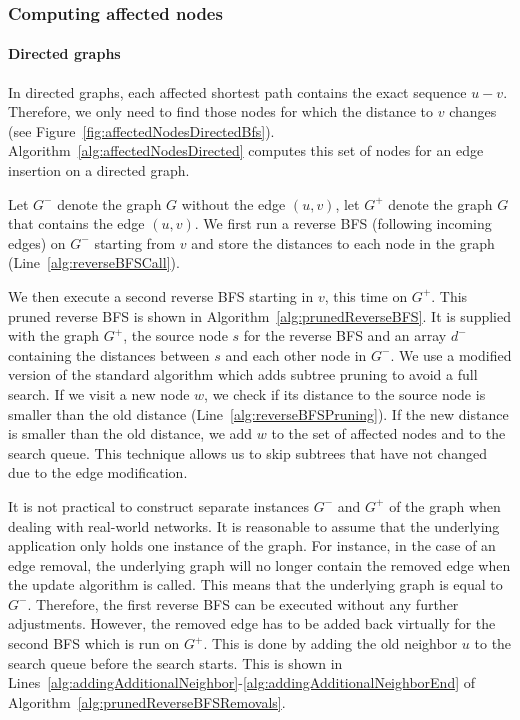 \subsubsection{Computing affected nodes}
\paragraph{Directed graphs}
In directed graphs, each affected shortest path contains the exact sequence $u - v$. Therefore, we only need to find those nodes for which the distance to $v$ changes (see Figure~\ref{fig:affectedNodesDirectedBfs}). Algorithm~\ref{alg:affectedNodesDirected} computes this set of nodes for an edge insertion on a directed graph.

Let $G^-$ denote the graph $G$ without the edge $(u, v)$, let $G^{+}$ denote the graph $G$ that contains the edge $(u, v)$. We first run a reverse BFS (following incoming edges) on $G^-$ starting from $v$ and store the distances to each node in the graph (Line~\ref{alg:reverseBFSCall}).

We then execute a second reverse BFS starting in $v$, this time on $G^{+}$. This pruned reverse BFS is shown in Algorithm~\ref{alg:prunedReverseBFS}. It is supplied with the graph $G^{+}$, the source node $s$ for the reverse BFS and an array $d^-$ containing the distances between $s$ and each other node in $G^{-}$. We use a modified version of the standard algorithm which adds subtree pruning to avoid a full search. If we visit a new node $w$, we check if its distance to the source node is smaller than the old distance (Line~\ref{alg:reverseBFSPruning}). If the new distance is smaller than the old distance, we add $w$ to the set of affected nodes and to the search queue. This technique allows us to skip subtrees that have not changed due to the edge modification.

It is not practical to construct separate instances $G^-$ and $G^{+}$ of the graph when dealing with real-world networks. It is reasonable to assume that the underlying application only holds one instance of the graph. For instance, in the case of an edge removal, the underlying graph will no longer contain the removed edge when the update algorithm is called. This means that the underlying graph is equal to $G^-$. Therefore, the first reverse BFS can be executed without any further adjustments. However, the removed edge has to be added back virtually for the second BFS which is run on $G^{+}$. This is done by adding the old neighbor $u$ to the search queue before the search starts. This is shown in Lines~\ref{alg:addingAdditionalNeighbor}-\ref{alg:addingAdditionalNeighborEnd} of Algorithm~\ref{alg:prunedReverseBFSRemovals}.

